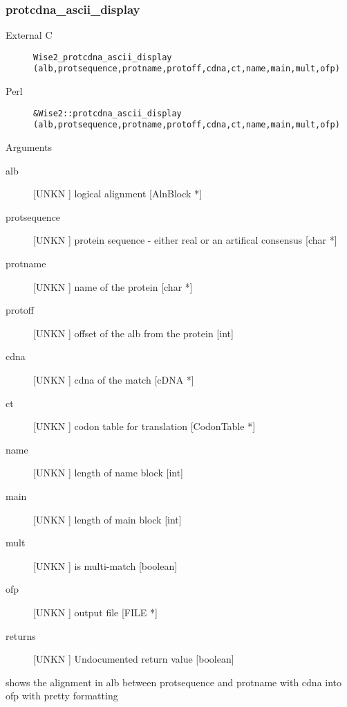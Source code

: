 \subsubsection{protcdna_ascii_display}
\begin{description}
\item[External C] {\tt Wise2_protcdna_ascii_display (alb,protsequence,protname,protoff,cdna,ct,name,main,mult,ofp)}
\item[Perl] {\tt &Wise2::protcdna_ascii_display (alb,protsequence,protname,protoff,cdna,ct,name,main,mult,ofp)}

\end{description}
Arguments
\begin{description}
\item[alb] [UNKN ] logical alignment [AlnBlock *]
\item[protsequence] [UNKN ] protein sequence - either real or an artifical consensus [char *]
\item[protname] [UNKN ] name of the protein [char *]
\item[protoff] [UNKN ] offset of the alb from the protein [int]
\item[cdna] [UNKN ] cdna of the match [cDNA *]
\item[ct] [UNKN ] codon table for translation [CodonTable *]
\item[name] [UNKN ] length of name block [int]
\item[main] [UNKN ] length of main block [int]
\item[mult] [UNKN ] is multi-match [boolean]
\item[ofp] [UNKN ] output file [FILE *]
\item[returns] [UNKN ] Undocumented return value [boolean]
\end{description}
shows the alignment in alb between protsequence and protname
with cdna into ofp with pretty formatting





